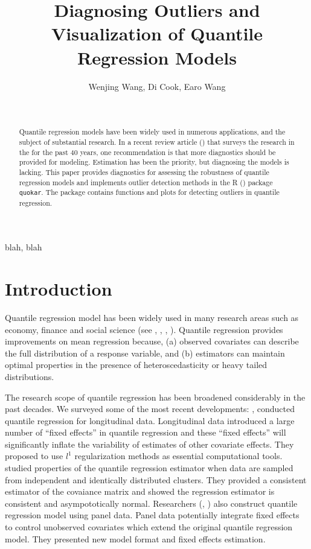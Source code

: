 \documentclass[11pt,a4paper,]{article}
\title{Diagnosing Outliers and Visualization of Quantile Regression Models}
\author{Wenjing Wang, Di Cook, Earo Wang}
\date{\sf\Date~\Month~\Year}
\theoremstyle{definition}
\theoremstyle{definition}
\theoremstyle{remark}
\begin{document}
\maketitle
\begin{abstract}
Quantile regression models have been widely used in numerous
applications, and the subject of substantial research. In a recent
review article (\textcite{koenker2017}) that surveys the research in the
for the past 40 years, one recommendation is that more diagnostics
should be provided for modeling. Estimation has been the priority, but
diagnosing the models is lacking. This paper provides diagnostics for
assessing the robustness of quantile regression models and implements
outlier detection methods in the R (\textcite{RCore}) package
\texttt{quokar}. The package contains functions and plots for detecting
outliers in quantile regression.
\end{abstract}
\begin{keywords}
blah, blah
\end{keywords}

\section{Introduction}\label{introduction}

Quantile regression model has been widely used in many research areas
such as economy, finance and social science (see
\textcite{autor2017effect}, \textcite{mitchell2017physical},
\textcite{gallego2017corporate},
\textcite{maciejowska2016probabilistic}). Quantile regression provides
improvements on mean regression because, (a) observed covariates can
describe the full distribution of a response variable, and (b)
estimators can maintain optimal properties in the presence of
heteroscedasticity or heavy tailed distributions.

The research scope of quantile regression has been broadened
considerably in the past decades. We surveyed some of the most recent
developments: \textcite{koenker2004quantile}, \textcite{geraci2006use}
conducted quantile regression for longitudinal data. Longitudinal data
introduced a large number of ``fixed effects'' in quantile regression
and these ``fixed effects'' will significantly inflate the variability
of estimates of other covariate effects. They proposed to use \(l^1\)
regularization methods as essential computational tools.
\textcite{parente2016quantile} studied properties of the quantile
regression estimator when data are sampled from independent and
identically distributed clusters. They provided a consistent estimator
of the covaiance matrix and showed the regression estimator is
consistent and asympototically normal. Researchers
(\textcite{galvao2011quantile}, \textcite{canay2011simple}) also
construct quantile regression model using panel data. Panel data
potentially integrate fixed effects to control unobserved covariates
which extend the original quantile regression model. They presented new
model format and fixed effects estimation.
\end{document}
